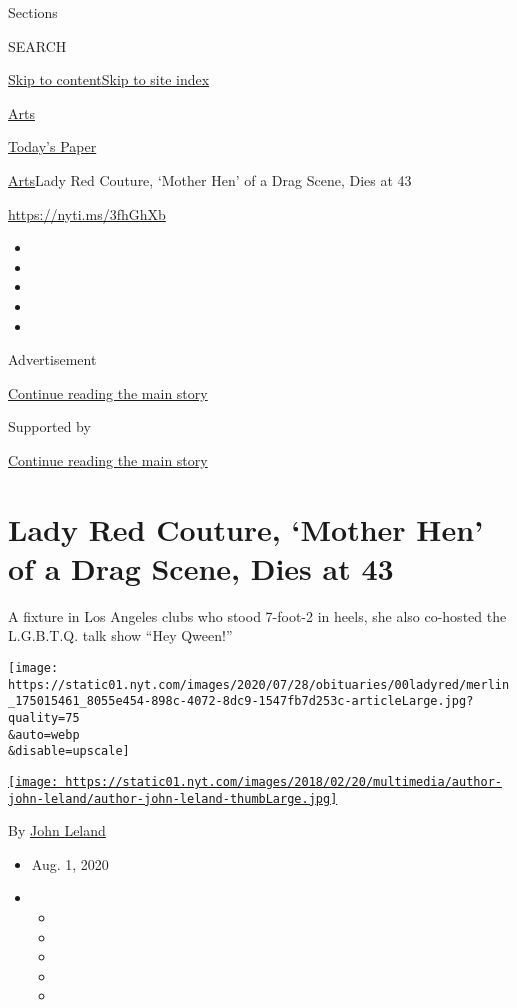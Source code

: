 Sections

SEARCH

\protect\hyperlink{site-content}{Skip to
content}\protect\hyperlink{site-index}{Skip to site index}

\href{https://www.nytimes.com/section/arts}{Arts}

\href{https://myaccount.nytimes.com/auth/login?response_type=cookie\&client_id=vi}{}

\href{https://www.nytimes.com/section/todayspaper}{Today's Paper}

\href{/section/arts}{Arts}\textbar{}Lady Red Couture, `Mother Hen' of a
Drag Scene, Dies at 43

\url{https://nyti.ms/3fhGhXb}

\begin{itemize}
\item
\item
\item
\item
\item
\end{itemize}

Advertisement

\protect\hyperlink{after-top}{Continue reading the main story}

Supported by

\protect\hyperlink{after-sponsor}{Continue reading the main story}

\hypertarget{lady-red-couture-mother-hen-of-a-drag-scene-dies-at-43}{%
\section{Lady Red Couture, `Mother Hen' of a Drag Scene, Dies at
43}\label{lady-red-couture-mother-hen-of-a-drag-scene-dies-at-43}}

A fixture in Los Angeles clubs who stood 7-foot-2 in heels, she also
co-hosted the L.G.B.T.Q. talk show ``Hey Qween!''

\texttt{[image: https://static01.nyt.com/images/2020/07/28/obituaries/00ladyred/merlin\_175015461\_8055e454-898c-4072-8dc9-1547fb7d253c-articleLarge.jpg?quality=75\\\&auto=webp\\\&disable=upscale]}

\href{https://www.nytimes.com/by/john-leland}{\texttt{[image: https://static01.nyt.com/images/2018/02/20/multimedia/author-john-leland/author-john-leland-thumbLarge.jpg]}}

By \href{https://www.nytimes.com/by/john-leland}{John Leland}

\begin{itemize}
\item
  Aug. 1, 2020
\item
  \begin{itemize}
  \item
  \item
  \item
  \item
  \item
  \end{itemize}
\end{itemize}

